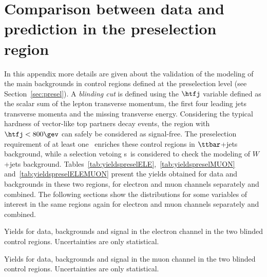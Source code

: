 \clearpage{\pagestyle{empty}\cleardoublepage}

\chapter{Comparison between data and prediction in the preselection region}
\label{app:datamcpresel}

In this appendix more details are given about the 
validation of the modeling of the main backgrounds in
control regions defined at the preselection level 
(see Section~\ref{sec:presel}). A {\it blinding cut}
is defined using the $\htfj$ variable defined as the scalar sum of the
lepton transverse momentum, the first four leading jets transverse momenta
and the missing transverse energy. Considering the typical hardness of
vector-like top partners decay events, the region with $\htfj<800\gev$ can
safely be considered as signal-free. 
The preselection requirement of at least one \bjet\ enriches these control
regions in $\ttbar$+jets background, while  a selection vetoing \bjet s\
is considered to check the modeling of $W$+jets background.
Tables~\ref{tab:yieldspreselELE},~\ref{tab:yieldspreselMUON} and~\ref{tab:yieldspreselELEMUON}
present the yields obtained for data and backgrounds in these two regions,
for electron and muon channels separately and combined.
The following sections show the distributions for some variables of interest
in the same regions again for electron and muon channels separately and combined.

\begin{table}[htb]\centering
        
\caption{Yields for data, backgrounds and signal in the electron channel in the two blinded control
                regions. Uncertainties are only statistical.}\label{tab:yieldspreselELE}
\end{table}

\begin{table}[htb]\centering
        
\caption{Yields for data, backgrounds and signal in the muon  channel in the two blinded control
                regions. Uncertainties are only statistical.}\label{tab:yieldspreselMUON}
\end{table}

